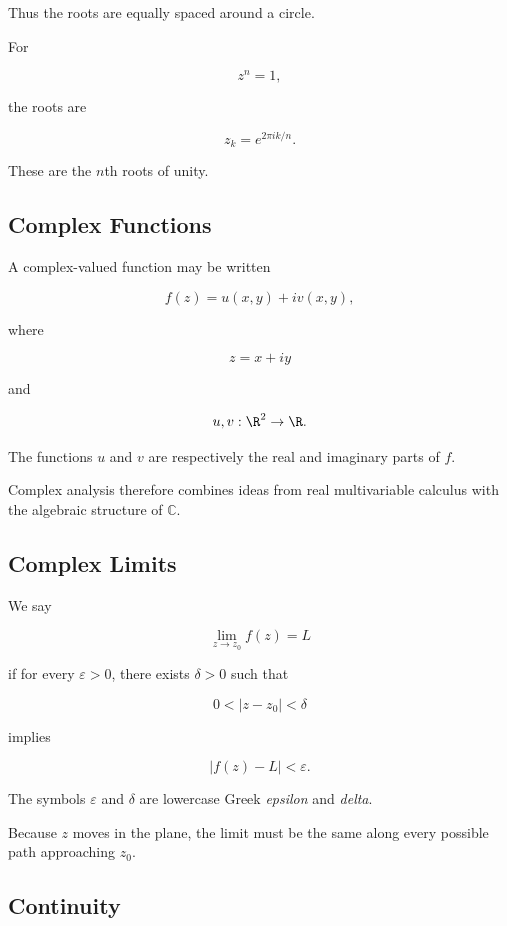 Thus the roots are equally spaced around a circle.

For

\[
z^n=1,
\]

the roots are

\[
\boxed{
z_k
=
e^{2\pi ik/n}.
}
\]

These are the \(n\)th roots of unity.

\subsection{Complex Functions}
\label{subsec:complex-functions}

A complex-valued function may be written

\[
\boxed{
f(z)=u(x,y)+iv(x,y),
}
\]

where

\[
z=x+iy
\]

and

\[
u,v:\R^2\to\R.
\]

The functions \(u\) and \(v\) are respectively the real and imaginary
parts of \(f\).

Complex analysis therefore combines ideas from real multivariable
calculus with the algebraic structure of \(\mathbb{C}\).

\subsection{Complex Limits}
\label{subsec:complex-limits}

We say

\[
\boxed{
\lim_{z\to z_0}f(z)=L
}
\]

if for every \(\varepsilon>0\), there exists \(\delta>0\) such that

\[
0<|z-z_0|<\delta
\]

implies

\[
|f(z)-L|<\varepsilon.
\]

The symbols \(\varepsilon\) and \(\delta\) are lowercase Greek
\emph{epsilon} and \emph{delta}.

Because \(z\) moves in the plane, the limit must be the same along every
possible path approaching \(z_0\).

\subsection{Continuity}
\label{subsec:complex-continuity}


